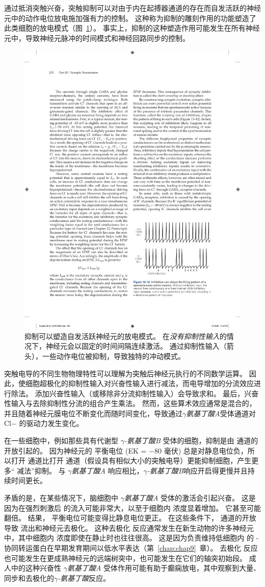 通过抵消突触兴奋，突触抑制可以对由于内在起搏器通道的存在而自发活跃的神经元中的动作电位放电施加强有力的控制。
这种称为抑制的雕刻作用的功能塑造了此类细胞的放电模式（图~\ref{fig:13_12}）。
事实上，抑制的这种塑造作用可能发生在所有神经元中，导致神经元脉冲的时间模式和神经回路同步的控制。


\begin{figure}[htbp]
	\centering
	\includegraphics[width=0.5\linewidth]{chap13/fig_13_12}
	\caption{抑制可以塑造自发活跃神经元的放电模式。
		在\textit{没有抑制性输入}的情况下，神经元会以固定的时间间隔连续激活。
		通过抑制性输入（箭头），一些动作电位被抑制，导致独特的冲动模式。}
	\label{fig:13_12}
\end{figure}


突触电导的不同生物物理特性可以理解为突触后神经元执行的不同数学运算。
因此，使细胞超极化的抑制性输入对兴奋性输入进行减法，而电导增加的分流效应进行除法。
添加兴奋性输入（或移除非分流抑制性输入）会导致求和。
最后，兴奋性输入与去除抑制性分流的组合产生乘法。
然而，这些算术效应通常是混合的，并且随着神经元膜电位不断变化而随时间变化，导致通过\textit{$\gamma$氨基丁酸A}受体通道对 Cl− 的驱动力发生变化。


在一些细胞中，例如那些具有代谢型 \textit{$\gamma$-氨基丁酸B} 受体的细胞，抑制是由  通道的开放引起的。
因为神经元的  平衡电位 (EK = −80 毫伏) 总是对静息电位负，所以打开  通道比打开  通道（假设具有相似大小的突触电导）更能抑制细胞，产生更多“ 减法”抑制。
与 \textit{$\gamma$氨基丁酸A} 响应相比，\textit{$\gamma$-氨基丁酸B}响应开启得更慢并且持续时间更长。


矛盾的是，在某些情况下，脑细胞中 \textit{$\gamma$氨基丁酸A} 受体的激活会引起兴奋。
这是因为在强烈刺激后  的流入可能非常大，以至于细胞内  浓度显着增加。
它甚至可能翻倍。
结果， 平衡电位可能变得比静息电位更正。
在这些条件下， 通道的开放导致  流出和神经元去极化。
这种去极化  反应通常发生在新生动物的许多神经元中，其中细胞内  浓度即使在静止时也往往很高。
这是因为负责维持低细胞内  的 - 协同转运蛋白在早期发育期间以低水平表达（第~\ref{chap:chap9}~章）。
去极化  反应也可能发生在更成熟神经元的远端树突中，也可能发生在它们的轴突初始段。
成人中的这种兴奋性 \textit{$\gamma$氨基丁酸A} 受体作用可能有助于癫痫放电，其中观察到大量、同步和去极化的\textit{$\gamma$-氨基丁酸}反应。



